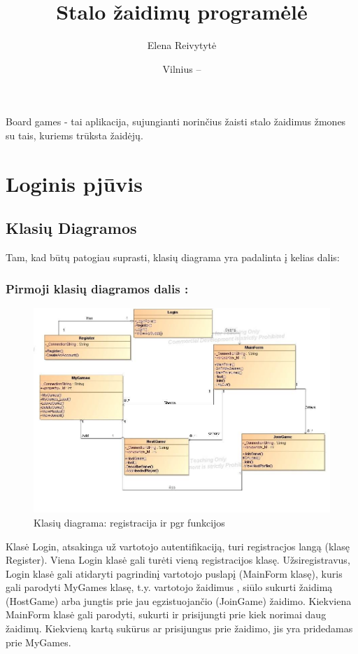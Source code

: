 \documentclass{VUMIFPSkursinis}
\title{Stalo žaidimų programėlė}
\author{Elena Reivytytė}
\date{Vilnius – \the\year}
\begin{document}
\maketitle

\tableofcontents

Board games - tai aplikacija, sujungianti norinčius žaisti stalo žaidimus žmones
su tais, kuriems trūksta žaidėjų.

\section{Loginis pjūvis}
	\subsection{Klasių Diagramos}
			Tam, kad būtų patogiau suprasti, klasių diagrama yra padalinta į kelias dalis:
		\subsubsection*{Pirmoji klasių diagramos dalis :}
			\begin{figure}[H]
				\centering
				\includegraphics[scale=0.5]{img/BoardGamesClassDiagram}
				\caption{Klasių diagrama: registracija ir pgr funkcijos}
				\label{img:BoardGamesClassDiagram}
			\end{figure}
			Klasė Login, atsakinga už vartotojo autentifikaciją, turi  registracjos langą (klasę Register). Viena Login klasė gali turėti vieną   registracijos klasę. Užsiregistravus, Login klasė gali atidaryti pagrindinį vartotojo puslapį (MainForm klasę), kuris gali parodyti MyGames klasę, t.y. vartotojo žaidimus , siūlo sukurti žaidimą (HostGame) arba jungtis prie jau egzistuojančio (JoinGame) žaidimo. Kiekviena MainForm klasė gali parodyti, sukurti ir prisijungti prie kiek norimai daug žaidimų. Kiekvieną kartą sukūrus ar prisijungus prie žaidimo, jis yra pridedamas prie MyGames. 
\end{document}
